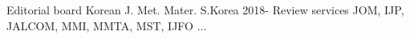 

\begin{cvhonors}

  \cvhonor
    {Editorial board}
    {Korean J. Met. Mater.}
    {S.Korea} %
    {2018-} %
    \cvhonor
    {Review services}
    {JOM, IJP, JALCOM, MMI, MMTA, MST, IJFO ...}
    {}
    {} %
\end{cvhonors}
